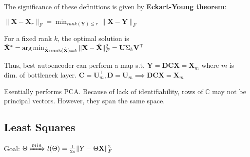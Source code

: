 The significance of these definitions is given by \textbf{Eckart-Young theorem}:

$\|\mathbf{X}-\mathbf{X}_r\|_F = \min_{rank(\mathbf{Y}) \leq r}\|\mathbf{X}-\mathbf{Y}\|_F$ 

For a fixed rank $k$, the optimal solution is $\hat{\mathbf{X}}^* = \operatorname*{arg\,min}_{\hat{\mathbf{X}}: \text{rank}(\hat{\mathbf{X}}) = k} \|\mathbf{X}-\hat{\mathbf{X}}\|_F^2 = \mathbf U \Sigma_k \mathbf V^\top$

Thus, best autoencoder can perform a map s.t. $\mathbf{Y} = \mathbf{DCX} = \mathbf{X}_m$ where $m$ is dim. of bottleneck layer. $\mathbf{C}=\mathbf{U}_m^\top, \mathbf{D}=\mathbf{U}_m \implies \mathbf{DCX} = \mathbf{X}_m$

Esentially performs PCA. Because of lack of identifiability, rows of $\mathbb C$ may not be principal vectors. However, they span the same space.

\subsection*{Least Squares}
Goal: $\Theta \xMapsto[]{min} l(\Theta) = \frac{1}{2s}\|Y - \Theta \X\|_F^2 $